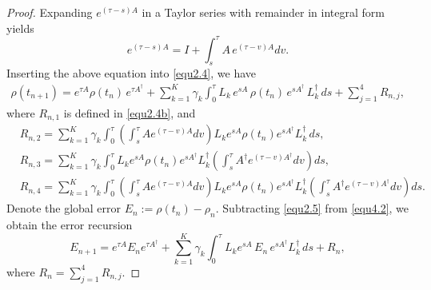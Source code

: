 \documentclass[10pt,a4paper]{amsart}
\begin{document}
\begin{proof}
Expanding $e^{(\tau-s)A}$ in a Taylor series with remainder in integral form yields
\begin{equation*}
  e^{(\tau-s)A}=I+\int_{s}^{\tau}A \, e^{(\tau-v)A}dv.
\end{equation*}
Inserting the above equation into \eqref{equ2.4}, we have
\begin{eqnarray}\label{equ4.2}
  \rho(t_{n+1})=e^{\tau A}\rho(t_n) \, e^{\tau A^{\dag}}+\sum_{k=1}^K\gamma_k
  \int_0^{\tau}L_k \, e^{sA} \, \rho(t_n) \, e^{sA^{\dag}} \, L_k^{\dag} \, ds+\sum_{j=1}^4R_{n,j},
\end{eqnarray}
where $R_{n,1}$ is defined in \eqref{equ2.4b}, and
  \begin{align*}
  &R_{n,2}=\sum_{k=1}^K\gamma_k
  \int_0^{\tau}\left(\int_s^{\tau}Ae^{(\tau-v)A}dv\right)L_ke^{sA}\rho(t_n)e^{sA^{\dag}} L_k^{\dag} \, ds,\\
  &R_{n,3}=\sum_{k=1}^K\gamma_k
  \int_0^{\tau}L_ke^{sA}\rho(t_n)e^{sA^{\dag}} L_k^{\dag}\left(\int_s^{\tau}A^{\dag}e^{(\tau-v)A^{\dag}}dv\right)ds,\\
  &R_{n,4}=\sum_{k=1}^K\gamma_k
  \int_0^{\tau}\left(\int_s^{\tau}Ae^{(\tau-v)A}dv\right)L_ke^{sA}\rho(t_n)e^{sA^{\dag}} L_k^{\dag}\left(\int_s^{\tau}A^{\dag}e^{(\tau-v)A^{\dag}}dv\right)ds.
\end{align*}
Denote the global error $E_n:=\rho(t_n)-\rho_n$. Subtracting \eqref{equ2.5} from \eqref{equ4.2}, we obtain the error recursion
\begin{equation}\label{equ4.3}
  E_{n+1}=e^{\tau A}E_ne^{\tau A^{\dag}}+\sum_{k=1}^K\gamma_k
  \int_0^{\tau}L_ke^{sA}  \, E_n  \, e^{sA^{\dag}} L_k^{\dag} \, ds+R_n,
\end{equation}
where $R_n=\sum_{j=1}^4R_{n,j}$.


\end{proof}
\end{document}
